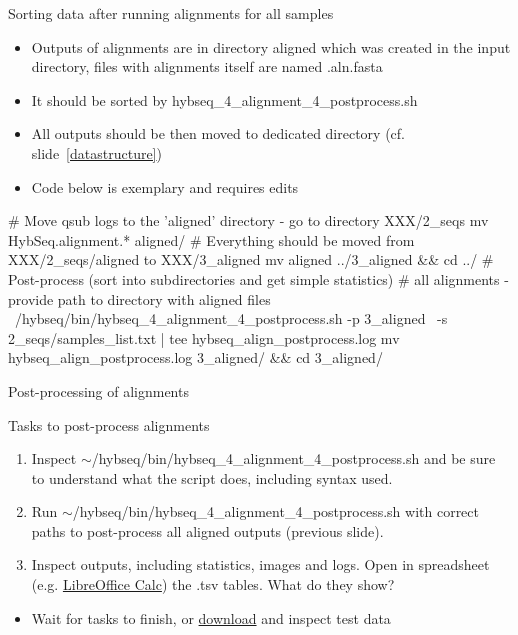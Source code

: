 \documentclass[compress,  xelatex, 11pt, xcolor=x11names, aspectratio=169,
	hyperref={
		bookmarks=true,
		unicode=true,
		colorlinks=true,
		pdftitle={HybSeq course},
		plainpages=false,
		pdfauthor={Vojtech Zeisek},
		pdfsubject={Practical processing of HybSeq target enrichment sequencing data on computing grids like MetaCentrum},
		pdfcreator={XeLaTeX},
		pdfkeywords={BASH, command line, GNU, HybSeq, Linux, MetaCentrum, sequencing shell, target enrichment},
		linkcolor=Turquoise4, %
		anchorcolor=DodgerBlue4, %
		citecolor=DodgerBlue4, %
		filecolor=DodgerBlue4, %
		menucolor=Tan4, %
		urlcolor=DarkOliveGreen4 %
		},
	url={hyphens, lowtilde} %
	]{beamer}
\renewcommand{\texttt}[1]{\colorbox{Cornsilk2}{{\ttfamily #1}}}
\renewcommand{\alert}[1]{\textcolor{OrangeRed3}{#1}}
\begin{document}
\begin{frame}[fragile]{Sorting data after running alignments for all samples}
	\begin{itemize}
		\item Outputs of alignments are in directory \texttt{aligned} which was created in the input directory, files with alignments itself are named \texttt{*.aln.fasta}
		\item It should be sorted by \texttt{hybseq\_4\_alignment\_4\_postprocess.sh}
		\item All outputs should be then moved to dedicated directory (cf. slide~\ref{datastructure})
		\item \alert{Code below is exemplary and requires edits}
	\end{itemize}
	\begin{bashcode}
    # Move qsub logs to the 'aligned' directory - go to directory XXX/2_seqs
    mv HybSeq.alignment.* aligned/
    # Everything should be moved from XXX/2_seqs/aligned to XXX/3_aligned
    mv aligned ../3_aligned && cd ../
    # Post-process (sort into subdirectories and get simple statistics)
    # all alignments - provide path to directory with aligned files
    ~/hybseq/bin/hybseq_4_alignment_4_postprocess.sh -p 3_aligned \
      -s 2_seqs/samples_list.txt | tee hybseq_align_postprocess.log
    mv hybseq_align_postprocess.log 3_aligned/ && cd 3_aligned/
	\end{bashcode}
\end{frame}

\begin{frame}{Post-processing of alignments}
	\begin{exampleblock}{Tasks to post-process alignments}
		\begin{enumerate}
			\item Inspect \texttt{$\sim$/hybseq/bin/hybseq\_4\_alignment\_4\_postprocess.sh} and be sure to understand what the script does, including syntax used.
			\item Run \texttt{$\sim$/hybseq/bin/hybseq\_4\_alignment\_4\_postprocess.sh} with correct paths to post-process all aligned outputs (previous slide).
			\item Inspect outputs, including statistics, images and logs. Open in spreadsheet (e.g. \href{https://www.libreoffice.org/}{LibreOffice Calc}) the \texttt{*.tsv} tables. What do they show?
		\end{enumerate}
	\end{exampleblock}
	\vfill
	\begin{itemize}
		\item Wait for tasks to finish, or \href{https://botany.natur.cuni.cz/zeisek/hybseq_course_zingibers_3_aligned.zip}{download} and inspect test data
	\end{itemize}
	\vfill
\end{frame}
\end{document}
